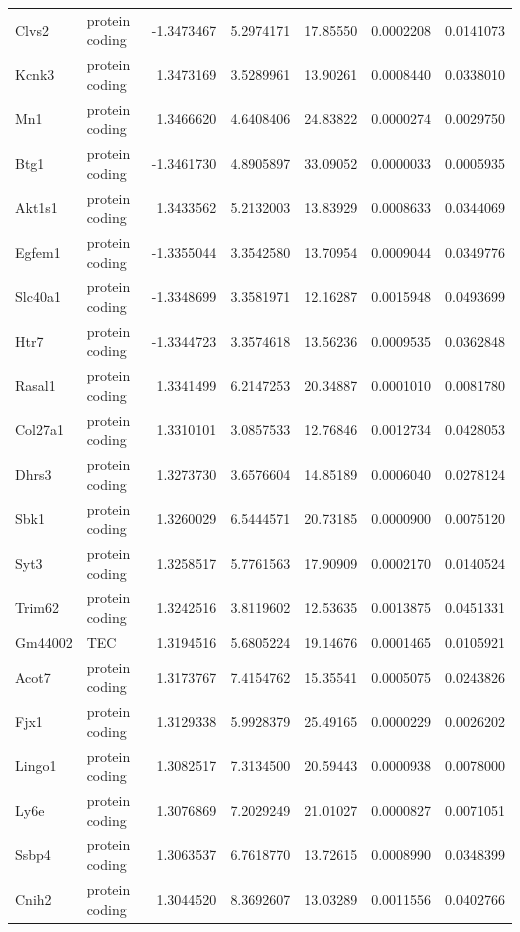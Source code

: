 \documentclass[onehalf,12pt]{beavtex}
\begin{document}
\begin{longtable}{llrrrrr}
  \addlinespace
  Clvs2 & protein coding & -1.3473467 & 5.2974171 & 17.85550 & 0.0002208 & 0.0141073\\
  Kcnk3 & protein coding & 1.3473169 & 3.5289961 & 13.90261 & 0.0008440 & 0.0338010\\
  Mn1 & protein coding & 1.3466620 & 4.6408406 & 24.83822 & 0.0000274 & 0.0029750\\
  Btg1 & protein coding & -1.3461730 & 4.8905897 & 33.09052 & 0.0000033 & 0.0005935\\
  Akt1s1 & protein coding & 1.3433562 & 5.2132003 & 13.83929 & 0.0008633 & 0.0344069\\
  \addlinespace
  Egfem1 & protein coding & -1.3355044 & 3.3542580 & 13.70954 & 0.0009044 & 0.0349776\\
  Slc40a1 & protein coding & -1.3348699 & 3.3581971 & 12.16287 & 0.0015948 & 0.0493699\\
  Htr7 & protein coding & -1.3344723 & 3.3574618 & 13.56236 & 0.0009535 & 0.0362848\\
  Rasal1 & protein coding & 1.3341499 & 6.2147253 & 20.34887 & 0.0001010 & 0.0081780\\
  Col27a1 & protein coding & 1.3310101 & 3.0857533 & 12.76846 & 0.0012734 & 0.0428053\\
  \addlinespace
  Dhrs3 & protein coding & 1.3273730 & 3.6576604 & 14.85189 & 0.0006040 & 0.0278124\\
  Sbk1 & protein coding & 1.3260029 & 6.5444571 & 20.73185 & 0.0000900 & 0.0075120\\
  Syt3 & protein coding & 1.3258517 & 5.7761563 & 17.90909 & 0.0002170 & 0.0140524\\
  Trim62 & protein coding & 1.3242516 & 3.8119602 & 12.53635 & 0.0013875 & 0.0451331\\
  Gm44002 & TEC & 1.3194516 & 5.6805224 & 19.14676 & 0.0001465 & 0.0105921\\
  \addlinespace
  Acot7 & protein coding & 1.3173767 & 7.4154762 & 15.35541 & 0.0005075 & 0.0243826\\
  Fjx1 & protein coding & 1.3129338 & 5.9928379 & 25.49165 & 0.0000229 & 0.0026202\\
  Lingo1 & protein coding & 1.3082517 & 7.3134500 & 20.59443 & 0.0000938 & 0.0078000\\
  Ly6e & protein coding & 1.3076869 & 7.2029249 & 21.01027 & 0.0000827 & 0.0071051\\
  Ssbp4 & protein coding & 1.3063537 & 6.7618770 & 13.72615 & 0.0008990 & 0.0348399\\
  \addlinespace
  Cnih2 & protein coding & 1.3044520 & 8.3692607 & 13.03289 & 0.0011556 & 0.0402766\\

\end{longtable}
\end{document}
